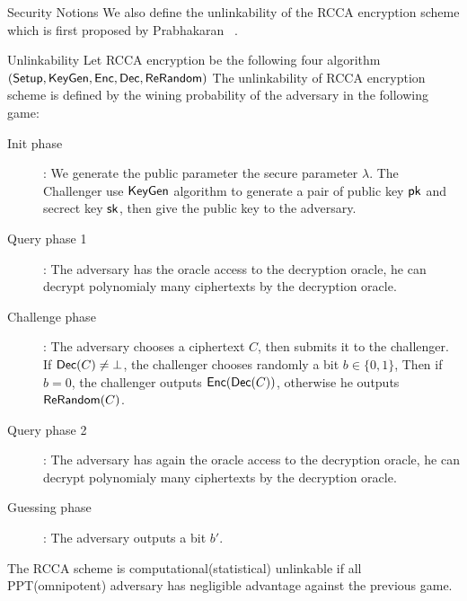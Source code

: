 \begin{subsection}{Security Notions}
  We also define the unlinkability of the RCCA encryption scheme which is first proposed by Prabhakaran \etal~\cite{DBLP:conf/crypto/PrabhakaranR07}.
  \begin{myDef}{Unlinkability}
    Let RCCA encryption be the following four algorithm $({\mathsf{Setup}}, {\mathsf{KeyGen}}, {\mathsf{Enc}}, {\mathsf{Dec}}, {\mathsf{ReRandom}})$
    The unlinkability of RCCA encryption scheme is defined by the wining probability of the adversary in the following game:
    \begin{description}
    \item[Init phase]:
      We generate the public parameter \wrt the secure parameter $\lambda$. The Challenger use ${\mathsf{KeyGen}}$ algorithm to generate a pair of public key $\mathsf{pk}$ and secrect key $\mathsf{sk}$, then give the public key to the adversary.
    \item[Query phase 1]: The adversary has the oracle access to the decryption oracle, he can decrypt polynomialy many ciphertexts by the decryption oracle.
    \item[Challenge phase]: The adversary chooses a ciphertext $C$, then submits it to the challenger. If ${\mathsf{Dec}}(C)\neq \bot$, the challenger chooses randomly a bit $b \in \{0,1\}$, Then if $b = 0$, the challenger outputs ${\mathsf{Enc}}({\mathsf{Dec}}(C))$, otherwise he outputs ${\mathsf{ReRandom}}(C)$.
    \item[Query phase 2]: The adversary has again the oracle access to the decryption oracle, he can decrypt polynomialy many ciphertexts by the decryption oracle.
    \item[Guessing phase]: The adversary outputs a bit $b'$.
    \end{description}

    The RCCA scheme is computational(\resp statistical) unlinkable if all PPT(\resp omnipotent) adversary has negligible advantage against the previous game. 
  \end{myDef}
  

\end{subsection}
